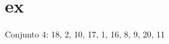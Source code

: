 

\section{ex}


\begin{frame}[fragile]
  Conjunto 4: 18, 2, 10, 17, 1, 16, 8, 9, 20, 11
\end{frame}


